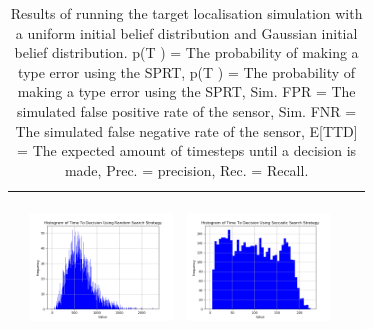 \begin{landscape}
\begin{table}[h!]
\begin{tabular}{ | c | c | c | c | c |}
\begin{minipage}[c][36mm][c]{38mm}
    \end{minipage}
    &
    \begin{minipage}[c][36mm][c]{38mm}
      \includegraphics[width=38mm, height=38mm]{Chapters/MultiAgentTargetDetection/Figs/Results/Prior/Gaussian/SingleAgentSingleSourceGaussianRandomHistogram.png}
    \end{minipage}
    &
    \begin{minipage}[c][36mm][c]{38mm}
      \includegraphics[width=38mm, height=38mm]{Chapters/MultiAgentTargetDetection/Figs/Results/Prior/Gaussian/SingleAgentSingleSourceGaussianSaccadicHistogram.png}
    \end{minipage}
    \\


    \hline
   
  \end{tabular}
  \caption{Results of running the target localisation simulation with a  uniform initial belief distribution and Gaussian initial belief distribution. p(T ) = The probability of making a type  error using the SPRT, p(T ) = The probability of making a type  error using the SPRT, Sim. FPR = The simulated false positive rate of the sensor, Sim. FNR = The simulated false negative rate of the sensor, E[TTD] = The expected amount of timesteps until a decision is made, Prec. = precision, Rec. = Recall. }\label{table:ORToolsResults}
\end{table}
\end{landscape}
